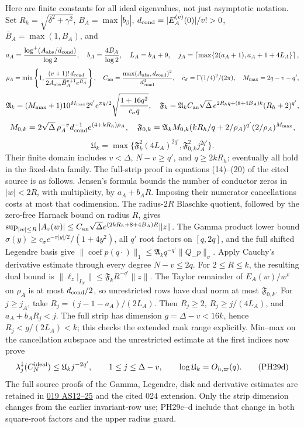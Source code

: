 \documentclass[10pt]{article}
\begin{document}
Here are finite constants for all ideal eigenvalues, not just asymptotic notation. Set \(R_h=\sqrt{\delta^2+\gamma^2}\), \(B_A=\max|b_\beta|\), \(d_{\rm cond}=|E_A^{(v)}(0)|/v!>0\), \(\bar B_A=\max(1,B_A)\), and \[
 a_A=\frac{\log^+(A_{\rm abs}/d_{\rm cond})}{\log2},\quad
 b_A=\frac{4B_A}{\log2},\quad L_A=b_A+9,\quad
 j_A=\left\lceil\max\{2(a_A+1),a_A+1+4L_A\}\right\rceil ,
\] \[
 \rho_A=\min\left\{1,\frac{(v+1)!\,d_{\rm cond}}
 {2A_{\rm abs}\bar B_A^{v+1}e^{\bar B_A}}\right\},\quad
 C_{\rm an}=\frac{\max(A_{\rm abs},d_{\rm cond})^2}{d_{\rm cond}^3},
 \quad c_\sigma=\Gamma(1/4)^2/(2\pi),\quad M_{\max}=2q-v-q',
\] \[
 \mathfrak A_k=(M_{\max}+1)10^{M_{\max}}2^{q'}e^{\pi q/2}
 \sqrt{\frac{1+16q^2}{c_\sigma q}},\quad
 \mathfrak F_k=\mathfrak A_kC_{\rm an}\sqrt{\Delta}\,
 e^{2R_hq+(8+4B_A)k}(R_h+2)^{q'},
\] \[
 M_{0,k}=2\sqrt\Delta\,\rho_A^{-v}d_{\rm cond}^{-1}
 e^{(4+kR_h)\rho_A},\quad
 \mathfrak F_{0,k}=\mathfrak A_kM_{0,k}
 (kR_h/q+2/\rho_A)^{q'}(2/\rho_A)^{M_{\max}},
\] \[
 \mathfrak U_k=\max\{\mathfrak F_k^2(4L_A)^{2q'},
 \mathfrak F_{0,k}^2j_A^{2q'}\}.
 \tag{PH29c}
\] Their finite domain includes \(v<\Delta\), \(N-v\ge q'\), and \(q\ge2kR_h\); eventually all hold in the fixed-data family. The full-strip proof in equations (14)--(20) of the cited source is as follows. Jensen's formula bounds the number of conductor zeros in \(|w|<2R\), with multiplicity, by \(a_A+b_AR\). Imposing their numerator cancellations costs at most that codimension. The radius-\(2R\) Blaschke quotient, followed by the zero-free Harnack bound on radius \(R\), gives \(\sup_{|w|\le R}|A_z(w)|
\le C_{\rm an}\sqrt\Delta e^{(2kR_h+8+4B_A)R}\|z\|\). The Gamma product lower bound \(\sigma(y)\ge c_\sigma e^{-\pi|y|/2}/(1+4y^2)\), all \(q'\) root factors on \([q,2q]\), and the full shifted Legendre basis give \(\|\operatorname{coef}p(q\cdot)\|_1
\le\mathfrak A_kq^{-q'}\|Q_-p\|_\sigma\). Apply Cauchy's derivative estimate through every degree \(N-v\le2q\). For \(2\le R\le k\), the resulting dual bound is \(\|\ell_z|_{I_N}\|\le\mathfrak F_kR^{-q'}\|z\|\). The Taylor remainder of \(E_A(w)/w^v\) on \(\rho_A\) is at most \(d_{\rm cond}/2\), so unrestricted rows have dual norm at most \(\mathfrak F_{0,k}\). For \(j\ge j_A\), take \(R_j=(j-1-a_A)/(2L_A)\). Then \(R_j\ge2\), \(R_j\ge j/(4L_A)\), and \(a_A+b_AR_j<j\). The full strip has dimension \(g=\Delta-v<16k\), hence \(R_j<g/(2L_A)<k\); this checks the extended rank range explicitly. Min--max on the cancellation subspace and the unrestricted estimate at the first indices now prove \[
 \lambda_j^\downarrow(C_N^{\rm ideal})
 \le\mathfrak U_kj^{-2q'},\qquad1\le j\le\Delta-v,\qquad
 \log\mathfrak U_k=O_{h,\varpi}(q).
 \tag{PH29d}
\] The full source proofs of the Gamma, Legendre, disk and derivative estimates are retained in \href{https://github.com/KokunoYumeto/zeta-function-research-reader/blob/9b7b0bad40b33dc88bba7d8cb1548da1fadbb585/workbenches/splitzero-tandem/continuations/20260921-original-angle-word/ANGLE_PROOFS.md\#L186}{019 AS12--25} and the cited 024 extension. Only the strip dimension changes from the earlier invariant-row use; PH29c--d include that change in both square-root factors and the upper radius guard.
\end{document}
